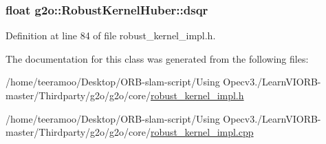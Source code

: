 \subsubsection[{\texorpdfstring{dsqr}{dsqr}}]{\setlength{\rightskip}{0pt plus 5cm}float g2o\+::\+Robust\+Kernel\+Huber\+::dsqr\hspace{0.3cm}{\ttfamily [private]}}\hypertarget{classg2o_1_1RobustKernelHuber_ada9d48b59d64f72c18b11905de8dca0d}{}\label{classg2o_1_1RobustKernelHuber_ada9d48b59d64f72c18b11905de8dca0d}


Definition at line 84 of file robust\+\_\+kernel\+\_\+impl.\+h.



The documentation for this class was generated from the following files\+:\begin{DoxyCompactItemize}
\item 
/home/teeramoo/\+Desktop/\+O\+R\+B-\/slam-\/script/\+Using Opecv3./\+Learn\+V\+I\+O\+R\+B-\/master/\+Thirdparty/g2o/g2o/core/\hyperlink{robust__kernel__impl_8h}{robust\+\_\+kernel\+\_\+impl.\+h}\item 
/home/teeramoo/\+Desktop/\+O\+R\+B-\/slam-\/script/\+Using Opecv3./\+Learn\+V\+I\+O\+R\+B-\/master/\+Thirdparty/g2o/g2o/core/\hyperlink{robust__kernel__impl_8cpp}{robust\+\_\+kernel\+\_\+impl.\+cpp}\end{DoxyCompactItemize}
